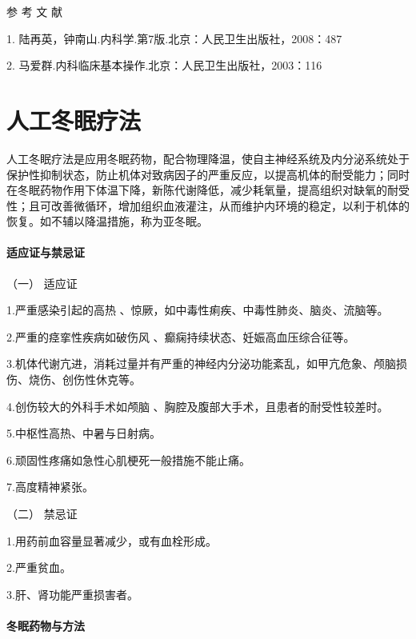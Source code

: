 \protect\hypertarget{text00387.html}{}{}

\hypertarget{text00387.htmlux5cux23CHP16-8-4}{}
参 考 文 献

1. 陆再英，钟南山.内科学.第7版.北京：人民卫生出版社，2008：487

2. 马爱群.内科临床基本操作.北京：人民卫生出版社，2003：116

\protect\hypertarget{text00388.html}{}{}

\chapter{人工冬眠疗法}

人工冬眠疗法是应用冬眠药物，配合物理降温，使自主神经系统及内分泌系统处于保护性抑制状态，防止机体对致病因子的严重反应，以提高机体的耐受能力；同时在冬眠药物作用下体温下降，新陈代谢降低，减少耗氧量，提高组织对缺氧的耐受性；且可改善微循环，增加组织血液灌注，从而维护内环境的稳定，以利于机体的恢复。如不辅以降温措施，称为亚冬眠。

\subsubsection{适应证与禁忌证}

\hypertarget{text00388.htmlux5cux23CHP16-9-1-1}{}
（一） 适应证

1.严重感染引起的高热 、惊厥，如中毒性痢疾、中毒性肺炎、脑炎、流脑等。

2.严重的痉挛性疾病如破伤风 、癫痫持续状态、妊娠高血压综合征等。

3.机体代谢亢进，消耗过量并有严重的神经内分泌功能紊乱，如甲亢危象、颅脑损伤、烧伤、创伤性休克等。

4.创伤较大的外科手术如颅脑 、胸腔及腹部大手术，且患者的耐受性较差时。

5.中枢性高热、中暑与日射病。

6.顽固性疼痛如急性心肌梗死一般措施不能止痛。

7.高度精神紧张。

\hypertarget{text00388.htmlux5cux23CHP16-9-1-2}{}
（二） 禁忌证

1.用药前血容量显著减少，或有血栓形成。

2.严重贫血。

3.肝、肾功能严重损害者。

\subsubsection{冬眠药物与方法}

